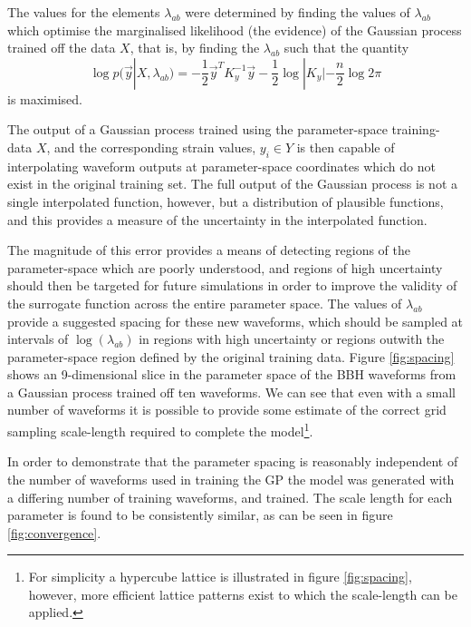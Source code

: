 \documentclass[a4paper]{article}
\begin{document}
The values for the elements $\lambda_{ab}$ were determined by finding
the values of $\lambda_{ab}$ which optimise the marginalised
likelihood (the evidence) of the Gaussian process trained off the data
$X$, that is, by finding the $\lambda_{ab}$ such that the quantity
\begin{equation}
  \label{eq:evidence}
  \log p(\vec{y} | X, \lambda_{ab}) = - \frac{1}{2} \vec{y}^T K_y^{-1} \vec{y} - \frac{1}{2} \log|K_y| - \frac{n}{2} \log 2 \pi
\end{equation}
is maximised.


The output of a Gaussian process trained using the parameter-space
training-data $X$, and the corresponding strain values, $y_i \in Y$ is
then capable of interpolating waveform outputs at parameter-space
coordinates which do not exist in the original training set. The full
output of the Gaussian process is not a single interpolated function,
however, but a distribution of plausible functions, and this provides
a measure of the uncertainty in the interpolated function.

The magnitude of this error provides a means of detecting regions of
the parameter-space which are poorly understood, and regions of high
uncertainty should then be targeted for future simulations in order to
improve the validity of the surrogate function across the entire
parameter space. The values of $\lambda_{ab}$ provide a suggested
spacing for these new waveforms, which should be sampled at intervals
of $\log(\lambda_{ab})$ in regions with high uncertainty or regions
outwith the parameter-space region defined by the original training
data. Figure \ref{fig:spacing} shows an 9-dimensional slice in the
parameter space of the BBH waveforms from a Gaussian process trained
off ten waveforms. We can see that even with a small number of
waveforms it is possible to provide some estimate of the correct grid
sampling scale-length required to complete the model\footnote{For
  simplicity a hypercube lattice is illustrated in figure
  \ref{fig:spacing}, however, more efficient lattice patterns exist to
  which the scale-length can be applied.}.

In order to demonstrate that the parameter spacing is reasonably
independent of the number of waveforms used in training the GP the
model was generated with a differing number of training waveforms, and
trained. The scale length for each parameter is found to be
consistently similar, as can be seen in figure \ref{fig:convergence}.
\end{document}
